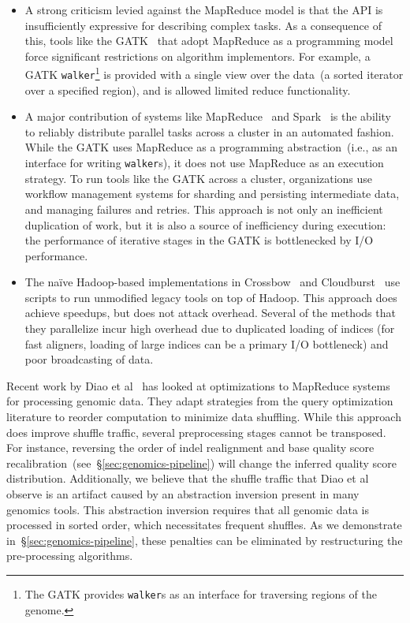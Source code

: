\documentclass[masters]{ucbthesis}
\begin{document}
\begin{itemize}
\item A strong criticism levied against the MapReduce model is that the API is insufficiently expressive
for describing complex tasks. As a consequence of this, tools like the GATK~\cite{mckenna10} that
adopt MapReduce as a programming model force significant restrictions on algorithm implementors. For
example, a GATK \texttt{walker}\footnote{The GATK provides \texttt{walker}s as an interface for
traversing regions of the genome.} is provided with a single view over the data~(a sorted iterator over a
specified region), and is allowed limited reduce functionality.
\item A major contribution of systems like MapReduce~\cite{dean08} and Spark~\cite{zaharia10,
zaharia12} is the ability to reliably distribute parallel tasks across a cluster in an automated fashion. While
the GATK uses MapReduce as a programming abstraction~(i.e., as an interface for writing
\texttt{walker}s), it does not use MapReduce as an execution strategy. To run tools like the GATK across
a cluster, organizations use workflow management systems for sharding and persisting intermediate
data, and managing failures and retries. This approach is not only an inefficient duplication of work, but it
is also a source of inefficiency during execution: the performance of iterative stages in the GATK is
bottlenecked by I/O performance.
\item The na\"{i}ve Hadoop-based implementations in Crossbow~\cite{langmead09} and
Cloudburst~\cite{schatz09} use scripts to run unmodified legacy tools on top of Hadoop. This approach
does achieve speedups, but does not attack overhead. Several of the methods that they parallelize
incur high overhead due to duplicated loading of indices (for fast aligners, loading of large indices can be
a primary I/O bottleneck) and poor broadcasting of data.
\end{itemize}

Recent work by Diao et al~\cite{diao15} has looked at optimizations to MapReduce systems for
processing genomic data. They adapt strategies from the query optimization literature to reorder
computation to minimize data shuffling. While this approach does improve shuffle traffic, several
preprocessing stages cannot be transposed. For instance, reversing the order of indel realignment and
base quality score recalibration~(see~\S\ref{sec:genomics-pipeline}) will change the inferred quality
score distribution. Additionally, we believe that the shuffle traffic that Diao et al observe is an artifact
caused by an abstraction inversion present in many genomics tools. This abstraction inversion requires
that all genomic data is processed in sorted order, which necessitates frequent shuffles. As we
demonstrate in~\S\ref{sec:genomics-pipeline}, these penalties can be eliminated by restructuring the
pre-processing algorithms.
\end{document}
